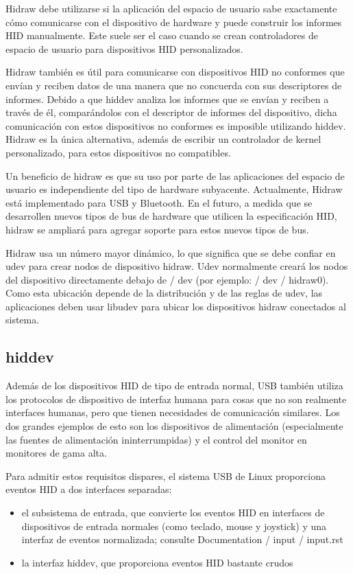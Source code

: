 Hidraw debe utilizarse si la aplicación del espacio de usuario sabe exactamente cómo
comunicarse con el dispositivo de hardware y puede construir los informes HID manualmente. Este suele ser el caso cuando se crean controladores de espacio de usuario para dispositivos HID personalizados.

Hidraw también es útil para comunicarse con dispositivos HID no conformes que envían y reciben datos de una manera que no concuerda con sus descriptores de informes. Debido a que hiddev analiza los informes que se envían y reciben a través de él, comparándolos con el descriptor de informes del dispositivo, dicha comunicación con estos dispositivos no conformes es imposible utilizando hiddev. Hidraw es la única alternativa, además de escribir un controlador de kernel personalizado, para estos dispositivos no compatibles.

Un beneficio de hidraw es que su uso por parte de las aplicaciones del espacio de usuario es independiente del tipo de hardware subyacente. Actualmente, Hidraw está implementado para USB y Bluetooth. En el futuro, a medida que se desarrollen nuevos tipos de bus de hardware que utilicen la especificación HID, hidraw se ampliará para agregar soporte para estos nuevos tipos de bus.

Hidraw usa un número mayor dinámico, lo que significa que se debe confiar en udev para crear nodos de dispositivo hidraw. Udev normalmente creará los nodos del dispositivo directamente debajo de / dev (por ejemplo: / dev / hidraw0). Como esta ubicación depende de la distribución y de las reglas de udev, las aplicaciones deben usar libudev para ubicar los dispositivos hidraw conectados al sistema.

\subsection{hiddev}

Además de los dispositivos HID de tipo de entrada normal, USB también utiliza los protocolos de dispositivo de interfaz humana para cosas que no son realmente interfaces humanas, pero que tienen necesidades de comunicación similares. Los dos grandes ejemplos de esto son los dispositivos de alimentación (especialmente las fuentes de alimentación ininterrumpidas) y el control del monitor en monitores de gama alta.

Para admitir estos requisitos dispares, el sistema USB de Linux proporciona eventos HID a dos interfaces separadas:

\begin{itemize}
\item el subsistema de entrada, que convierte los eventos HID en interfaces de dispositivos de entrada normales (como teclado, mouse y joystick) y una interfaz de eventos normalizada; consulte Documentation / input / input.rst
\item la interfaz hiddev, que proporciona eventos HID bastante crudos
\end{itemize}

